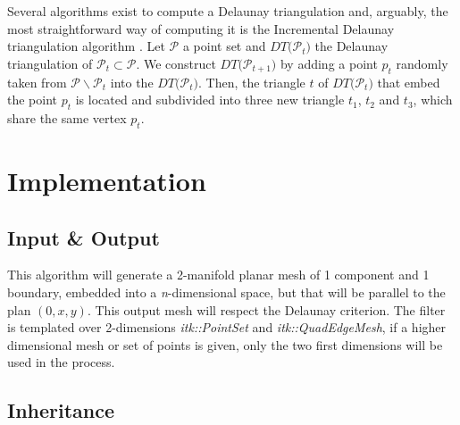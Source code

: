 \documentclass{InsightArticle}
\begin{document}
Several algorithms exist to compute a Delaunay triangulation and, arguably, the most straightforward way of computing it is the Incremental Delaunay triangulation algorithm \cite{Devillers1998}. Let $\mathcal{P}$ a point set and $\mathit{DT(} \mathcal{P_{\mathit{t}}} \mathit{)}$ the Delaunay triangulation of $\mathcal{P_{\mathit{t}}}\subset\mathcal{P}$. We construct $\mathit{DT(} \mathcal{P_{\mathit{t+1}}} \mathit{)}$ by adding a point $\mathit{p_{t}}$ randomly taken from $\mathcal{P} \backslash \mathcal{P_{\mathit{t}}}$ into the $\mathit{DT(} \mathcal{P_{\mathit{t}}} \mathit{)}$. Then, the triangle $\mathit{t}$ of $\mathit{DT(} \mathcal{P_{\mathit{t}}} \mathit{)}$ that embed the point $\mathit{p_{t}}$ is located and subdivided into three new triangle $\mathit{t_{1}}$, $\mathit{t_{2}}$ and $\mathit{t_{3}}$, which share the same vertex $\mathit{p_{t}}$.\\

\section{Implementation}

\subsection{Input \& Output}

This algorithm will generate a 2-manifold planar mesh of 1 component and 1 boundary, embedded into a \emph{n}-dimensional space, but that will be parallel to the plan $(0,x,y)$. This output mesh will respect the Delaunay criterion. The filter is templated over 2-dimensions \textit{itk::PointSet} and \textit{itk::QuadEdgeMesh}, if a higher dimensional mesh or set of points is given, only the two first dimensions will be used in the process.

\subsection{Inheritance}
\end{document}
